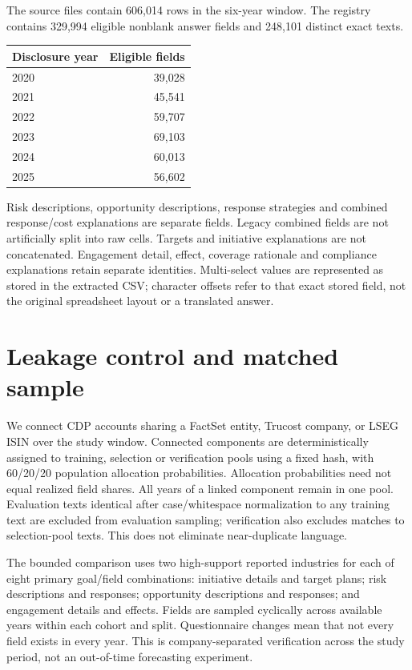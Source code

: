 \documentclass[12pt]{article}
\begin{document}
The source files contain 606,014 rows in the six-year window. The registry contains 329,994 eligible nonblank answer fields and 248,101 distinct exact texts.

\begin{center}\begin{tabular}{lr}\toprule
Disclosure year & Eligible fields \\\midrule
2020 & 39,028 \\
2021 & 45,541 \\
2022 & 59,707 \\
2023 & 69,103 \\
2024 & 60,013 \\
2025 & 56,602 \\
\bottomrule\end{tabular}\end{center}

Risk descriptions, opportunity descriptions, response strategies and combined
response/cost explanations are separate fields. Legacy combined fields are not
artificially split into raw cells. Targets and initiative explanations are not
concatenated. Engagement detail, effect, coverage rationale and compliance
explanations retain separate identities. Multi-select values are represented as
stored in the extracted CSV; character offsets refer to that exact stored field,
not the original spreadsheet layout or a translated answer.

\section{Leakage control and matched sample}
We connect CDP accounts sharing a FactSet entity, Trucost company, or LSEG ISIN
over the study window. Connected components are deterministically assigned to
training, selection or verification pools using a fixed hash, with 60/20/20
population allocation probabilities. Allocation probabilities need not equal
realized field shares. All years of a linked component remain in one pool.
Evaluation texts identical after case/whitespace normalization to any training
text are excluded from evaluation sampling; verification also excludes matches
to selection-pool texts. This does not eliminate near-duplicate language.

The bounded comparison uses two high-support reported industries for each of
eight primary goal/field combinations: initiative details and target plans;
risk descriptions and responses; opportunity descriptions and responses; and
engagement details and effects. Fields are sampled cyclically across available
years within each cohort and split. Questionnaire changes mean that not every
field exists in every year. This is company-separated verification across the
study period, not an out-of-time forecasting experiment.
\end{document}
